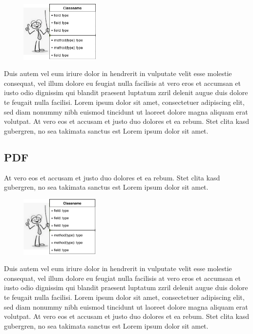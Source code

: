 \documentclass[11pt]{scrartcl}
\begin{document}
\begin{figure}
 \vspace{-16pt}
 \centering 
 \includegraphics[width=0.35\textwidth]{DrawIO/Diagramm_mit_Image.jpg}
 \label{fig:Diagramm-mit-Image-jpg}
 \vspace{-10pt}
\end{figure}
Duis autem vel eum iriure dolor in hendrerit in vulputate velit esse molestie consequat, vel illum dolore eu feugiat nulla facilisis at vero eros et accumsan et iusto odio dignissim qui blandit praesent luptatum zzril delenit augue duis dolore te feugait nulla facilisi. Lorem ipsum dolor sit amet, consectetuer adipiscing elit, sed diam nonummy nibh euismod tincidunt ut laoreet dolore magna aliquam erat volutpat.
At vero eos et accusam et justo duo dolores et ea rebum. Stet clita kasd gubergren, no sea takimata sanctus est Lorem ipsum dolor sit amet.

\subsection{PDF}
At vero eos et accusam et justo duo dolores et ea rebum. Stet clita kasd gubergren, no sea takimata sanctus est Lorem ipsum dolor sit amet.

\begin{figure}
 \vspace{-16pt}
 \centering 
 \includegraphics[width=0.35\textwidth]{DrawIO/Diagramm_mit_Image.pdf}
 \label{fig:Diagramm-mit-Image-pdf}
 \vspace{-10pt}
\end{figure}
Duis autem vel eum iriure dolor in hendrerit in vulputate velit esse molestie consequat, vel illum dolore eu feugiat nulla facilisis at vero eros et accumsan et iusto odio dignissim qui blandit praesent luptatum zzril delenit augue duis dolore te feugait nulla facilisi. Lorem ipsum dolor sit amet, consectetuer adipiscing elit, sed diam nonummy nibh euismod tincidunt ut laoreet dolore magna aliquam erat volutpat.
At vero eos et accusam et justo duo dolores et ea rebum. Stet clita kasd gubergren, no sea takimata sanctus est Lorem ipsum dolor sit amet.
\end{document}
